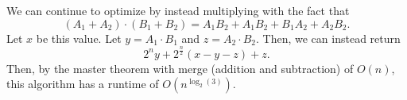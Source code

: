 We can continue to optimize by instead multiplying with the fact that \[
	(A_{1}+A_{2})\cdot (B_{1}+B_{2}) = A_{1}B_{2}+A_{1}B_{2}+B_{1}A_{2}+A_{2}B_{2}
.\] Let \( x \) be this value. Let \( y=A_{1}\cdot B_{1} \) and \( z=A_{2}\cdot B_{2} \). Then, we can instead return \[
	2^{n}y + 2^{\frac{n}{2}}(  x - y - z ) + z
.\] Then, by the master theorem with merge (addition and subtraction) of \( O(n) \), this algorithm has a runtime of \( O(n^{\log _2(3)} ) \).
